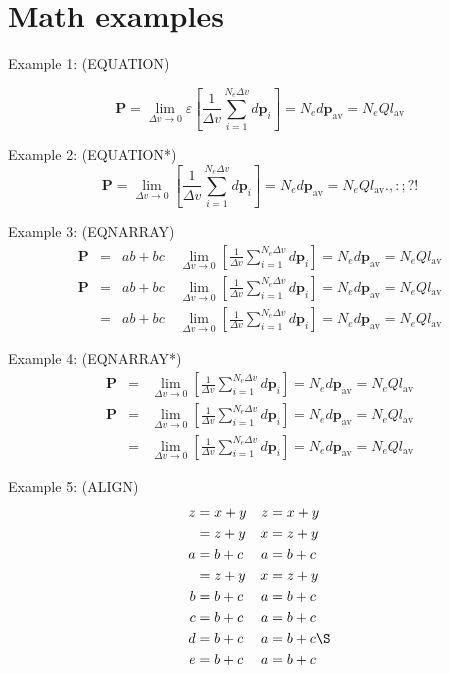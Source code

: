 \documentclass{book}
\begin{document}
\section*{Math examples}

\noindent Example 1: (EQUATION)

\begin{equation}
\mathbf{P} = \lim_{\Delta v\to 0} \varepsilon 
\left[\frac{1}{\Delta
v}\sum_{i=1}^{N_{e}\Delta v}d\mathbf{p}_{i}\right] =
N_{e}d\mathbf{p}_{\mathrm{av}} = N_{e}Q{l}_{\mathrm{av}} \label{eqn1}
\end{equation}

\noindent Example 2: (EQUATION*)
\begin{equation*}
\mathbf{P} = \lim_{\Delta v\to 0} \left[\frac{1}{\Delta v}\sum_{i=1}^{N_{e}\Delta v}d\mathbf{p}_{i}\right] = N_{e}d\mathbf{p}_{\mathrm{av}} = N_{e}Q{l}_{\mathrm{av}}.,:;?!
\end{equation*}

\noindent Example 3: (EQNARRAY)
\begin{eqnarray}
\mathbf{P} &= &ab + bc \quad \lim_{\Delta v\to 0} \left[\frac{1}{\Delta v}\sum_{i=1}^{N_{e}\Delta v}d\mathbf{p}_{i}\right] = N_{e}d\mathbf{p}_{\mathrm{av}} = N_{e}Q{l}_{\mathrm{av}} \nonumber \\
\mathbf{P} &= &ab + bc \quad \lim_{\Delta v\to 0} \left[\frac{1}{\Delta v}\sum_{i=1}^{N_{e}\Delta v}d\mathbf{p}_{i}\right] = N_{e}d\mathbf{p}_{\mathrm{av}} = N_{e}Q{l}_{\mathrm{av}} \\
 &= &ab + bc \quad \lim_{\Delta v\to 0} \left[\frac{1}{\Delta v}\sum_{i=1}^{N_{e}\Delta v}d\mathbf{p}_{i}\right] = N_{e}d\mathbf{p}_{\mathrm{av}} = N_{e}Q{l}_{\mathrm{av}} 
\end{eqnarray}

\noindent Example 4: (EQNARRAY*)
\begin{eqnarray*}
\mathbf{P} &= &\lim_{\Delta v\to 0} \left[\frac{1}{\Delta v}\sum_{i=1}^{N_{e}\Delta v}d\mathbf{p}_{i}\right] = N_{e}d\mathbf{p}_{\mathrm{av}} = N_{e}Q{l}_{\mathrm{av}} \\
\mathbf{P} &= &\lim_{\Delta v\to 0} \left[\frac{1}{\Delta v}\sum_{i=1}^{N_{e}\Delta v}d\mathbf{p}_{i}\right] = N_{e}d\mathbf{p}_{\mathrm{av}} = N_{e}Q{l}_{\mathrm{av}} \\
&= &\lim_{\Delta v\to 0} \left[\frac{1}{\Delta v}\sum_{i=1}^{N_{e}\Delta v}d\mathbf{p}_{i}\right] = N_{e}d\mathbf{p}_{\mathrm{av}} = N_{e}Q{l}_{\mathrm{av}} 
\end{eqnarray*}

\noindent Example 5: (ALIGN)
\begin{align}
z &= x+y &z &= x+y \\
  &= z+y &x &= z+y \nonumber\\
a &= b+c &a &= b+c \ttag{*} \\
  &= z+y &x &= z+y \notag\\
b &= b+c &a &= b+c \ttag{\dag} \\
c &= b+c &a &= b+c \ttag{\ddag} \\
d &= b+c &a &= b+c \ttag*{\S} \\
e &= b+c &a &= b+c \ttag{\P}
\end{align}
\end{document}
